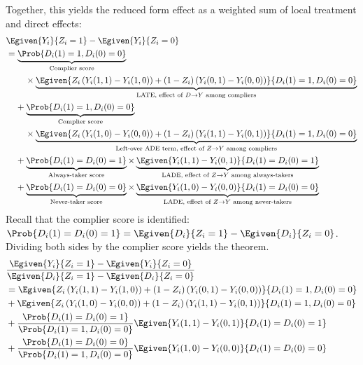 Together, this yields the reduced form effect as a weighted sum of local treatment and direct effects: 
\begin{align*}
    &\Egiven{Y_i}{Z_i = 1} - \Egiven{Y_i}{Z_i = 0} \\
    &= 
    \underbrace{\Prob{D_i(1) = 1, D_i(0) = 0}}_{\text{Complier score}} \\
    & \;\;\;\; \;\;\;\; \times
    \underbrace{\Egiven{ Z_i \left(Y_i(1, 1) - Y_i(1, 0) \right)
        + (1 - Z_i) \left(Y_i(0, 1) - Y_i(0, 0) \right) }{
            D_i(1) = 1, D_i(0) = 0}}_{
                \text{LATE, effect of } D \to Y \text{ among compliers}} \\
    & \;\;\;\; +
    \underbrace{\Prob{D_i(1) = 1, D_i(0) = 0}}_{\text{Complier score}} \\
    & \;\;\;\; \;\;\;\; \times
    \underbrace{\Egiven{Z_i \left(Y_i(1, 0) - Y_i(0, 0) \right)
        + (1 - Z_i) \left(Y_i(1, 1) - Y_i(0, 1) \right)}{
            D_i(1) = 1, D_i(0) = 0}}_{
                \text{Left-over ADE term, effect of } Z \to Y \text{ among compliers}} \\
    & \;\;\;\; + 
    \underbrace{\Prob{D_i(1) = D_i(0) = 1}}_{\text{Always-taker score}}
    \times
    \underbrace{\Egiven{Y_i(1,1) - Y_i(0,1)}{D_i(1) = D_i(0) = 1}}_{
            \text{LADE, effect of } Z \to Y \text{ among always-takers}
        } \\
    & \;\;\;\; + \underbrace{\Prob{D_i(1) = D_i(0) = 0}}_{\text{Never-taker score}}
    \times
    \underbrace{\Egiven{Y_i(1,0) - Y_i(0,0)}{D_i(1) = D_i(0) = 0}}_{
            \text{LADE, effect of } Z \to Y \text{ among never-takers}
        }
\end{align*}
Recall that the complier score is identified: $\Prob{D_i(1) = D_i(0) = 1} = \Egiven{D_i}{Z_i = 1} - \Egiven{D_i}{Z_i = 0}$.
Dividing both sides by the complier score yields the theorem.
\begin{align*}
    &\frac{ \Egiven{Y_i}{Z_i = 1} - \Egiven{Y_i}{Z_i = 0}}{
        \Egiven{D_i}{Z_i = 1} - \Egiven{D_i}{Z_i = 0}} \\
    &= \Egiven{ Z_i \left(Y_i(1, 1) - Y_i(1, 0) \right)
        + (1 - Z_i) \left(Y_i(0, 1) - Y_i(0, 0) \right)}{
            D_i(1) = 1, D_i(0) = 0} \\
    &+ \Egiven{ Z_i \left(Y_i(1, 0) - Y_i(0, 0) \right)
        + (1 - Z_i) \left(Y_i(1, 1) - Y_i(0, 1) \right)}{
            D_i(1) = 1, D_i(0) = 0} \\
    &+ \frac{\Prob{D_i(1) = D_i(0) = 1}}{\Prob{D_i(1) = 1, D_i(0) = 0}}
        \Egiven{Y_i(1,1) - Y_i(0,1)}{D_i(1) = D_i(0) = 1} \\
    &+ \frac{\Prob{D_i(1) = D_i(0) = 0}}{\Prob{D_i(1) = 1, D_i(0) = 0}}
        \Egiven{Y_i(1,0) - Y_i(0,0)}{D_i(1) = D_i(0) = 0}
\end{align*}
